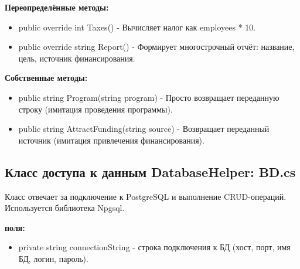 \documentclass[oneside,a4paper,14pt]{extarticle}
\begin{document}
\textbf{Переопределённые методы:}
\begin{itemize}
    \item public override int Taxes() - Вычисляет налог как employees * 10.
    \item public override string Report() - Формирует многострочный отчёт: название, цель, источник финансирования.
\end{itemize}

\textbf{Собственные методы:}
\begin{itemize}
    \item public string Program(string program) - Просто возвращает переданную строку (имитация проведения программы).
    \item public string AttractFunding(string source) - Возвращает переданный источник (имитация привлечения финансирования).
\end{itemize}

\newpage

\subsection*{Класс доступа к данным DatabaseHelper: BD.cs}

Класс отвечает за подключение к PostgreSQL и выполнение CRUD-операций. Используется библиотека Npgsql.

\textbf{поля:}
\begin{itemize}
    \item private string connectionString - строка подключения к БД (хост, порт, имя БД, логин, пароль).
\end{itemize}
\end{document}
